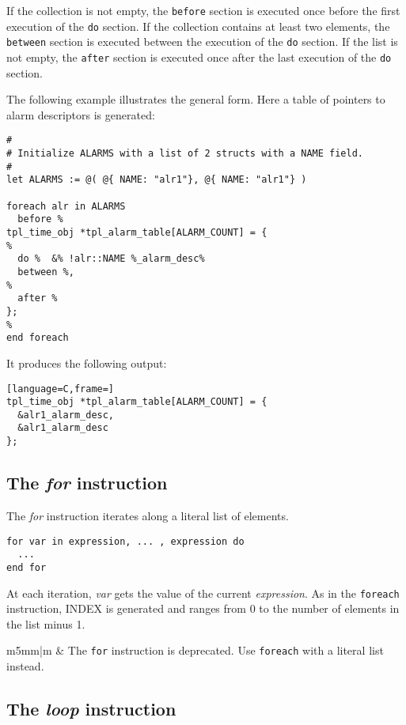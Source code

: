 \documentclass[11pt]{article}
\newcommand{\var}[1]{{\small\ttfamily #1}}
\newcommand\Warning{%
 \makebox[1.4em][c]{%
 \makebox[0pt][c]{\raisebox{-.05em}{\scriptsize!}}%
 \makebox[0pt][c]{\raisebox{-.2em}{\color{red}\Large$\bigtriangleup$}}}}%
\newcommand{\warning}[1]{%
\vspace{1em}
\hspace{-18.3mm}
\rowcolors{1}{white}{light-gray}
\begin{tabular}[b]{m{5mm}|m{\linewidth}}
\Warning & #1\\
\end{tabular}
}
\begin{document}
{If the collection is not empty, the \lstinline{before} section is executed once before the first execution of the \lstinline{do} section. If the collection contains at least two elements, the \lstinline{between} section is executed between the execution of the \lstinline{do} section.  If the list is not empty, the \lstinline{after} section is executed once after the last execution of the \lstinline{do} section.

The following example illustrates the general form. Here a table of pointers to alarm descriptors is generated:

\begin{lstlisting}
#
# Initialize ALARMS with a list of 2 structs with a NAME field.
#
let ALARMS := @( @{ NAME: "alr1"}, @{ NAME: "alr1"} )

foreach alr in ALARMS
  before %
tpl_time_obj *tpl_alarm_table[ALARM_COUNT] = {
%
  do %  &% !alr::NAME %_alarm_desc%
  between %,
%
  after %
};
%
end foreach
\end{lstlisting}

It produces the following output:

\begin{lstlisting}[language=C,frame=]
tpl_time_obj *tpl_alarm_table[ALARM_COUNT] = {
  &alr1_alarm_desc,
  &alr1_alarm_desc
};
\end{lstlisting}

%
%
\subsection{The {\em for} instruction}

The {\em for} instruction iterates along a literal list of elements.

\begin{lstlisting}
for var in expression, ... , expression do
  ...
end for
\end{lstlisting}

At each iteration, {\em var} gets the value of the current {\em expression}. As in the \lstinline{foreach} instruction, \var{INDEX} is generated and ranges from 0 to the number of elements in the list minus 1.

\warning{The \lstinline{for} instruction is deprecated. Use \lstinline{foreach} with a literal list instead.}

\subsection{The {\em loop} instruction}

}
\end{document}
